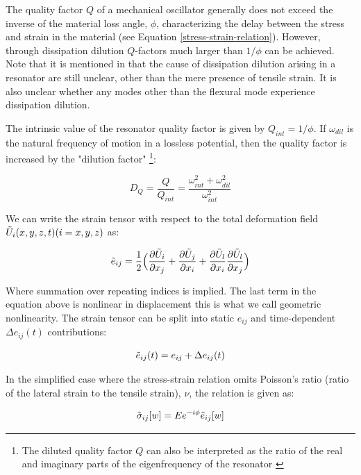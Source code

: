 \documentclass[%
 reprint,
nofootinbib,
 amsmath,amssymb,
 aps,
]{revtex4-2}
\begin{document}
The quality factor $Q$ of a mechanical oscillator generally does not exceed the inverse of the material loss angle, $\phi$, characterizing the delay between the stress and strain in the material (see Equation \ref{stress-strain-relation}). However, through dissipation dilution $Q$-factors much larger than $1/\phi$ can be achieved. Note that it is mentioned in \cite{generalized_dissipation_dilution} that the cause of dissipation dilution arising in a resonator are still unclear, other than the mere presence of tensile strain. It is also unclear whether any modes other than the flexural mode experience dissipation dilution. 
\newline

The intrinsic value of the resonator quality factor is given by $Q_{int} = 1/\phi$. If $\omega_{dil}$ is the natural frequency of motion in a lossless potential, then the quality factor is increased by the "dilution factor" \footnote{The diluted quality factor $Q$ can also be interpreted as the ratio of the real and imaginary parts of the eigenfrequency of the resonator \cite{ghadimi_thesis}}:

\begin{equation}\label{D_Q}
    D_Q = \frac{Q}{Q_{int}} = \frac{\omega_{int}^2 + \omega_{dil}^2}{\omega_{int}^2}
\end{equation}  

We can write the strain tensor with respect to the total deformation field $\Tilde{U}_{i}(x, y, z, t) (i = x, y, z)$ as:

\begin{equation}\label{strain tensor}
    \Tilde{e}_{ij} = \frac{1}{2} \Big ( \frac{\partial \Tilde{U}_i}{\partial x_j} + \frac{\partial \Tilde{U}_j}{\partial x_i} + \frac{\partial \Tilde{U}_l}{\partial x_i}\frac{\partial \Tilde{U}_l}{\partial x_j} \Big )
\end{equation}

Where summation over repeating indices is implied. The last term in the equation above is nonlinear in displacement this is what we call geometric nonlinearity. The strain tensor can be split into static $e_{ij}$ and time-dependent $\Delta e_{ij}(t)$ contributions:

$$ \Tilde{e}_{ij}(t) = e_{ij} + \Delta e_{ij}(t) $$

In the simplified case where the stress-strain relation omits Poisson's ratio (ratio of the lateral strain to the tensile strain), $\nu$, the relation is given as:

\begin{equation}\label{stress-strain-relation}
     \Tilde{\sigma}_{ij}[w] = E e^{-i\phi} \Tilde{e}_{ij}[w] 
\end{equation}
\end{document}
